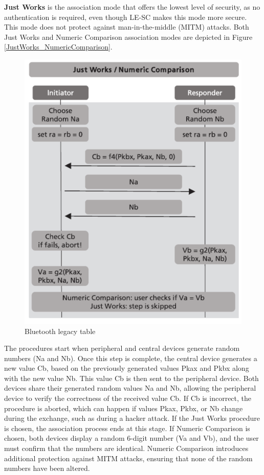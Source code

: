 \documentclass{Configuration_Files/PoliMi3i_thesis}
\begin{document}
\textbf{Just Works} is the association mode that offers the lowest level of security, as no authentication is required, even though LE-SC makes this mode more secure. This mode does not protect against man-in-the-middle (MITM) attacks. Both Just Works and Numeric Comparison association modes are depicted in Figure \ref{JustWorks_NumericComparison}.

\begin{figure}[H]
    \centering
    \includegraphics[scale=0.7]{Bluetooth_Security/6.png}
    \caption{Bluetooth legacy table}
    \label{bluetooth_sec_6}
\end{figure}

The procedures start when peripheral and central devices generate random numbers (Na and Nb). Once this step is complete, the central device generates a new value Cb, based on the previously generated values Pkax and Pkbx along with the new value Nb. This value Cb is then sent to the peripheral device. Both devices share their generated random values Na and Nb, allowing the peripheral device to verify the correctness of the received value Cb. If Cb is incorrect, the procedure is aborted, which can happen if values Pkax, Pkbx, or Nb change during the exchange, such as during a hacker attack. If the Just Works procedure is chosen, the association process ends at this stage. If Numeric Comparison is chosen, both devices display a random 6-digit number (Va and Vb), and the user must confirm that the numbers are identical. Numeric Comparison introduces additional protection against MITM attacks, ensuring that none of the random numbers have been altered.
\end{document}
